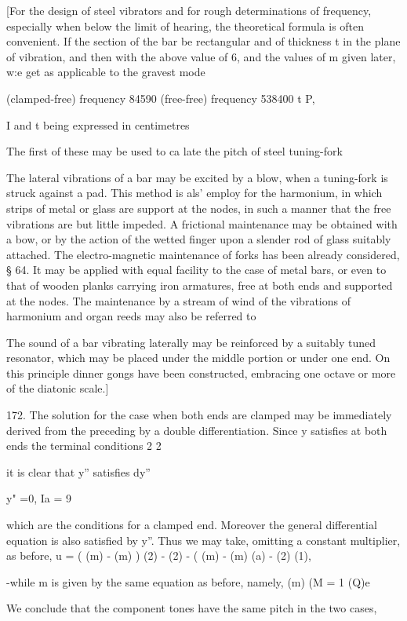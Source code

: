 [For the design of steel vibrators and for rough determinations
of frequency, especially when below the limit of hearing, the
theoretical formula is often convenient. If the section of the bar
be rectangular and of thickness t in the plane of vibration,
and then with the above value of 6, and the values of m given
later, w:e get as applicable to the gravest mode

(clamped-free) frequency 84590
(free-free) frequency 538400 t P,

I and t being expressed in centimetres

The first of these may be used to ca late the pitch of steel
tuning-fork


The lateral vibrations of a bar may be excited by a blow,
when a tuning-fork is struck against a pad. This method is als'
employ for the harmonium, in which strips of metal or glass are
support at the nodes, in such a manner that the free vibrations
are but little impeded. A frictional maintenance may be obtained
with a bow, or by the action of the wetted finger upon a slender
rod of glass suitably attached. The electro-magnetic maintenance
of forks has been already considered, § 64. It may be applied with
equal facility to the case of metal bars, or even to that of
wooden planks carrying iron armatures, free at both ends and
supported at the nodes. The maintenance by a stream of wind
of the vibrations of harmonium and organ reeds may also be
referred to

The sound of a bar vibrating laterally may be reinforced by a
suitably tuned resonator, which may be placed under the middle
portion or under one end. On this principle dinner gongs have
been constructed, embracing one octave or more of the diatonic
scale.]


172. The solution for the case when both ends are clamped may be
immediately derived from the preceding by a double differentiation.
Since y satisfies at both ends the terminal conditions 2 2

it is clear that y'' satisfies dy''

y" =0, Ia = 9

which are the conditions for a clamped end. Moreover the general
differential equation is also satisfied by y''. Thus we may take,
omitting a constant multiplier, as before, u = ( (m) - (m) ) (2) - (2) -
( (m) - (m) (a) - (2) (1),


-while m is given by the same equation as before, namely, (m) (M = 1
(Q)e

We conclude that the component tones have the same pitch in the two
cases,

